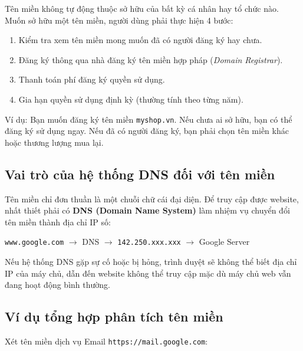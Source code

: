 \documentclass[11pt,oneside]{book}
\newcommand{\thd}[1]{\textcolor{white}{\textbf{\strut #1}}}
\newcommand{\codeinline}[1]{\textcolor{accentOrange}{\texttt{#1}}}
\begin{document}
Tên miền không tự động thuộc sở hữu của bất kỳ cá nhân hay tổ chức nào. Muốn sở hữu một tên miền, người dùng phải thực hiện 4 bước:
\begin{enumerate}[label=\textbf{\arabic*.}, leftmargin=1.8em, itemsep=2pt, parsep=0pt]
    \item Kiểm tra xem tên miền mong muốn đã có người đăng ký hay chưa.
    \item Đăng ký thông qua nhà đăng ký tên miền hợp pháp (\textit{Domain Registrar}).
    \item Thanh toán phí đăng ký quyền sử dụng.
    \item Gia hạn quyền sử dụng định kỳ (thường tính theo từng năm).
\end{enumerate}
Ví dụ: Bạn muốn đăng ký tên miền \codeinline{myshop.vn}. Nếu chưa ai sở hữu, bạn có thể đăng ký sử dụng ngay. Nếu đã có người đăng ký, bạn phải chọn tên miền khác hoặc thương lượng mua lại.

\subsection{Vai trò của hệ thống DNS đối với tên miền}

Tên miền chỉ đơn thuần là một chuỗi chữ cái đại diện. Để truy cập được website, nhất thiết phải có \textbf{DNS (Domain Name System)} làm nhiệm vụ chuyển đổi tên miền thành địa chỉ IP số:
\begin{center}
\codeinline{www.google.com} \quad $\rightarrow$ \quad DNS \quad $\rightarrow$ \quad \codeinline{142.250.xxx.xxx} \quad $\rightarrow$ \quad Google Server
\end{center}

\begin{warnBox}
Nếu hệ thống DNS gặp sự cố hoặc bị hỏng, trình duyệt sẽ không thể biết địa chỉ IP của máy chủ, dẫn đến website không thể truy cập mặc dù máy chủ web vẫn đang hoạt động bình thường.
\end{warnBox}

\subsection{Ví dụ tổng hợp phân tích tên miền}

Xét tên miền dịch vụ Email \codeinline{https://mail.google.com}:
\begin{prettyTableBox}
\end{prettyTableBox}
\end{document}
